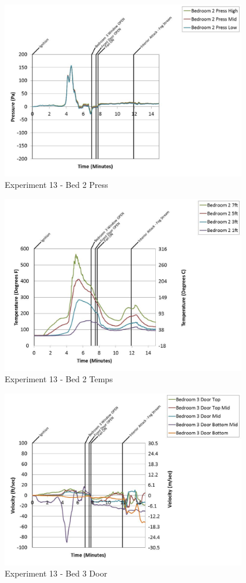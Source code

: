 \documentclass{article}
\begin{document}
\begin{appendices}
	\begin{figure}[h!]
		\centering
		\includegraphics[height=3.05in]{0_Images/Results_Charts/Exp_13_Charts/Bed2Press.pdf}
		\caption{Experiment 13 - Bed 2 Press}
	\end{figure}
 
	\clearpage

	\begin{figure}[h!]
		\centering
		\includegraphics[height=3.05in]{0_Images/Results_Charts/Exp_13_Charts/Bed2Temps.pdf}
		\caption{Experiment 13 - Bed 2 Temps}
	\end{figure}
 

	\begin{figure}[h!]
		\centering
		\includegraphics[height=3.05in]{0_Images/Results_Charts/Exp_13_Charts/Bed3Door.pdf}
		\caption{Experiment 13 - Bed 3 Door}
	\end{figure}
 

\end{appendices}
\end{document}
